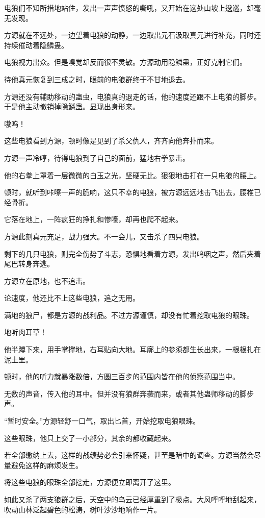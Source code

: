\begin{this_body}
电狼们不知所措地站住，发出一声声愤怒的嘶吼，又开始在这处山坡上逡巡，却毫无发现。

方源就在不远处，一边望着电狼的动静，一边取出元石汲取真元进行补充，同时还持续催动着隐鳞蛊。

电狼视力出众。但是嗅觉却反而很不灵敏。方源动用隐鳞蛊，正好克制它们。

待他真元恢复到三成之时，眼前的电狼群终于不甘地退去。

方源还没有辅助移动的蛊虫，电狼真的退走的话，他的速度还跟不上电狼的脚步。于是他主动撤销掉隐鳞蛊。显现出身形来。

嗷呜！

这些电狼看到方源，顿时像是见到了杀父仇人，齐齐向他奔扑而来。

方源一声冷哼，待得电狼到了自己的面前，猛地右拳暴击。

他的右拳上罩着一层微微的白玉之光，坚硬无比。狠狠地击打在一只电狼的腰上。

顿时，就听到咔嚓一声的脆响，这只不幸的电狼，被方源远远地击飞出去，腰椎已经骨折。

它落在地上，一阵疯狂的挣扎和惨嚎，却再也爬不起来。

方源此刻真元充足，战力强大。不一会儿，又击杀了四只电狼。

剩下的几只电狼，则完全伤势了斗志，恐惧地看着方源，发出呜咽之声，然后夹着尾巴转身奔逃。

方源立在原地，也不追击。

论速度，他还比不上这些电狼，追之无用。

满地的狼尸，都是方源的战利品。不过方源谨慎，却没有忙着挖取电狼的眼珠。

地听肉耳草！

他半蹲下来，用手掌撑地，右耳贴向大地。耳廓上的参须都生长出来，一根根扎在泥土里。

顿时，他的听力就暴涨数倍，方圆三百步的范围内皆在他的侦察范围当中。

无数的声音，传入他的耳中。但并没有狼群奔袭而来，或者其他蛊师移动的脚步声。

“暂时安全。”方源轻舒一口气，取出匕首，开始挖取电狼眼珠。

这些眼珠，他只上交了一小部分，其余的都收藏起来。

若全部缴纳上去，这样的战绩势必会引来怀疑，甚至是暗中的调查。方源当然会尽量避免这样的麻烦发生。

将这些电狼的眼珠全部挖走，方源便立即离开了这里。

如此又杀了两支狼群之后，天空中的乌云已经厚重到了极点。大风呼呼地刮起来，吹动山林泛起碧色的松涛，树叶沙沙地响作一片。


\end{this_body}
